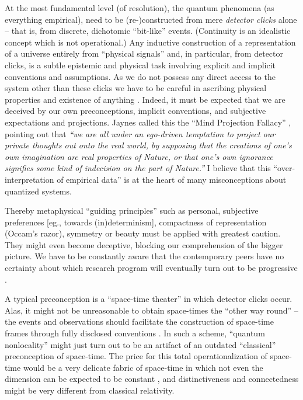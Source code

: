 \documentclass[%
  preprint,
 showpacs,
 showkeys,
 preprintnumbers,
 amsmath,amssymb,
 aps,
 prl,
  longbibliography,
 ]{revtex4-1}
\theoremstyle{definition}
\theoremstyle{remark}
\begin{document}
At the most fundamental level (of resolution),
the quantum phenomena (as everything empirical), need to be (re-)constructed
from mere {\em detector clicks} alone -- that is, from discrete, dichotomic ``bit-like'' events.
(Continuity is an idealistic concept which is not operational.)
Any inductive construction of a representation of a universe entirely from ``physical signals''
and, in particular, from detector clicks, is a subtle epistemic and physical task \cite{sum-3,wheeler-89}
involving explicit and implicit conventions and assumptions.
As we do not possess any direct access to the
system other than these clicks  we have to be careful in ascribing physical properties and existence
of anything \cite{stace1}.
Indeed, it must be expected that we are deceived
by our own preconceptions, implicit conventions, and subjective expectations and projections.
Jaynes called this
the ``Mind Projection Fallacy'' \cite{jaynes-89,jaynes-90}, pointing out that
{\em ``we are all under an ego-driven temptation to project our private
thoughts out onto the real world, by supposing that the creations of one's own imagination are real
properties of Nature, or that one's own ignorance signifies some kind of indecision on the part of
Nature.''}
I believe that this ``over-interpretation of empirical data''
is at the heart of many misconceptions
about quantized systems.

Thereby metaphysical ``guiding principles''
such as personal, subjective preferences [eg., towards (in)determinism],
compactness of representation (Occam's razor),
symmetry or beauty must be applied with greatest caution.
They might even become deceptive,
blocking our comprehension of the bigger picture.
We have to be constantly aware that the contemporary peers have no certainty
about which research program will eventually turn out to be progressive
\cite{lakatosch}.

A typical preconception is a ``space-time theater'' in which detector clicks occur.
Alas, it might not be unreasonable to obtain space-times the ``other way round''
-- the events and observations
should facilitate the construction of space-time frames
through fully disclosed conventions \cite{Knuth-Bahreyni}.
In such a scheme, ``quantum nonlocality'' might just turn out to be an artifact of an
outdated ``classical'' preconception of space-time.
The price for this total operationalization of space-time would be a very delicate
fabric of space-time in which not even the dimension can be expected to be constant \cite{sv1}, and
distinctiveness and connectedness might be very different from classical relativity.
\end{document}
